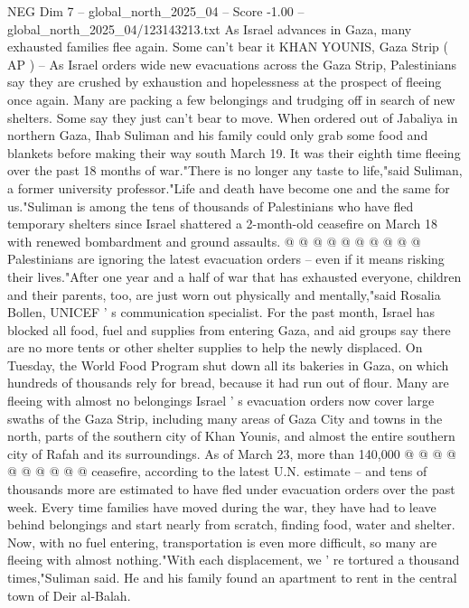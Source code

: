 \begin{textsample}{NEG Dim 7 – global\_north\_2025\_04 – Score -1.00 – global\_north\_2025\_04/123143213.txt}  \label{ex:f7_neg_098}
As Israel advances in Gaza, many exhausted families flee again.
Some can't bear it KHAN YOUNIS, Gaza Strip ( AP ) -- As Israel orders wide new evacuations across the Gaza Strip, Palestinians say they are crushed by exhaustion and hopelessness at the prospect of fleeing once again.
Many are packing a few belongings and trudging off in search of new shelters.
Some say they just can't bear to move.
When ordered out of Jabaliya in northern Gaza, Ihab Suliman and his family could only grab some food and blankets before making their way south March 19.
It was their eighth time fleeing over the past 18 months of war."There is no longer any taste to life,"said Suliman, a former university professor."Life and death have become one and the same for us."Suliman is among the tens of thousands of Palestinians who have fled temporary shelters since Israel shattered a 2-month-old ceasefire on March 18 with renewed bombardment and ground assaults. @ @ @ @ @ @ @ @ @ @ Palestinians are ignoring the latest evacuation orders -- even if it means risking their lives."After one year and a half of war that has exhausted everyone, children and their parents, too, are just worn out physically and mentally,"said Rosalia Bollen, UNICEF ' s communication specialist.
For the past month, Israel has blocked all food, fuel and supplies from entering Gaza, and aid groups say there are no more tents or other shelter supplies to help the newly displaced.
On Tuesday, the World Food Program shut down all its bakeries in Gaza, on which hundreds of thousands rely for bread, because it had run out of flour.
Many are fleeing with almost no belongings Israel ' s evacuation orders now cover large swaths of the Gaza Strip, including many areas of Gaza City and towns in the north, parts of the southern city of Khan Younis, and almost the entire southern city of Rafah and its surroundings.
As of March 23, more than 140,000 @ @ @ @ @ @ @ @ @ @ ceasefire, according to the latest U.N. estimate -- and tens of thousands more are estimated to have fled under evacuation orders over the past week.
Every time families have moved during the war, they have had to leave behind belongings and start nearly from scratch, finding food, water and shelter.
Now, with no fuel entering, transportation is even more difficult, so many are fleeing with almost nothing."With each displacement, we ' re tortured a thousand times,"Suliman said.
He and his family found an apartment to rent in the central town of Deir al-Balah.

\end{textsample}

